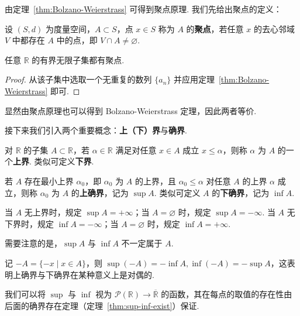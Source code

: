\documentclass[../main.tex]{subfiles}
\begin{document}
由定理~\ref{thm:Bolzano-Weierstrass} 可得到聚点原理. 我们先给出聚点的定义：

\begin{definition}[聚点的定义]
    设 $(S, d)$ 为度量空间，$A \subset S$，点 $x \in S$ 称为 $A$ 的\textbf{聚点}，若任意 $x$ 的去心邻域 $V$ 中都存在 $A$ 中的点，即 $V \cap A \neq \varnothing$. 
\end{definition}

\begin{theorem}[聚点原理] \label{thm:accumulation-point} 
    任意 $\mathbb R$ 的有界无限子集都有聚点. 
\end{theorem}

\begin{proof}
    从该子集中选取一个无重复的数列 $\{a_n\}$ 并应用定理~\ref{thm:Bolzano-Weierstrass} 即可. 
\end{proof}

显然由聚点原理也可以得到 Bolzano-Weierstrass 定理，因此两者等价. 

接下来我们引入两个重要概念：\textbf{上（下）界}与\textbf{确界}. 

\begin{definition}[确界的定义] \label{def:sup-inf}
    对 $\mathbb R$ 的子集 $A \subset \mathbb R$，若 $\alpha \in \mathbb R$ 满足对任意 $x \in A$ 成立 $x \leqslant \alpha$，则称 $\alpha$ 为 $A$ 的一个\textbf{上界}. 类似可定义\textbf{下界}. 
    
    若 $A$ 存在最小上界 $\alpha_0$，即 $\alpha_0$ 为 $A$ 的上界，且 $\alpha_0 \leqslant \alpha$ 对任意 $A$ 的上界 $\alpha$ 成立，则称 $\alpha_0$ 为 $A$ 的\textbf{上确界}，记为 $\sup A$. 类似可定义 $A$ 的\textbf{下确界}，记为 $\inf A$. 

    当 $A$ 无上界时，规定 $\sup A = +\infty$；当 $A = \varnothing$ 时，规定 $\sup A = -\infty$. 当 $A$ 无下界时，规定 $\inf A = -\infty$；当 $A = \varnothing$ 时，规定 $\inf A = +\infty$. 
\end{definition}

\begin{remark}
    需要注意的是，$\sup A$ 与 $\inf A$ 不一定属于 $A$. 

    记 $-A = \{-x \mid x \in A\}$，则 $\sup (-A) = -\inf A, \inf(-A) = -\sup A$，这表明上确界与下确界在某种意义上是对偶的. 

    我们可以将 $\sup$ 与 $\inf$ 视为 $\mathcal{P}(\mathbb R) \to \overline{\mathbb R}$ 的函数，其在每点的取值的存在性由后面的确界存在定理（定理~\ref{thm:sup-inf-exist}）保证. 
\end{remark}
\end{document}
